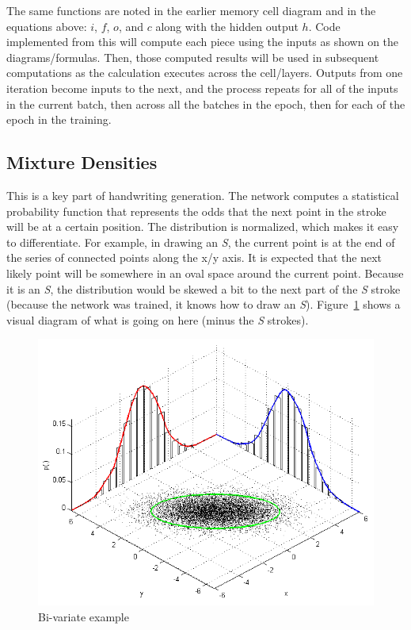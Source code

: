\documentclass{article}
\begin{document}
The same functions are noted in the earlier memory cell diagram and in the equations above: $i$, $f$, $o$, and $c$ along with the hidden output $h$. Code implemented from this will compute each piece using the inputs as shown on the diagrams/formulas. Then, those computed results will be used in subsequent computations as the calculation executes across the cell/layers. Outputs from one iteration become inputs to the next, and the process repeats for all of the inputs in the current batch, then across all the batches in the epoch, then for each of the epoch in the training.

\subsection{Mixture Densities}
This is a key part of handwriting generation. The network computes a statistical probability function that represents the odds that the next point in the stroke will be at a certain position. The distribution is normalized, which makes it easy to differentiate. For example, in drawing an \textit{S}, the current point is at the end of the series of connected points along the x/y axis. It is expected that the next likely point will be somewhere in an oval space around the current point. Because it is an \textit{S}, the distribution would be skewed a bit to the next part of the \textit{S} stroke (because the network was trained, it knows how to draw an \textit{S}). Figure~\ref{fig:bivariate} shows a visual diagram of what is going on here (minus the \textit{S} strokes).
    
    \begin{figure}[hbt!]
        \includegraphics[width=12cm]{graphics/Bivariate-example.png}
        \centering
        \caption{Bi-variate example \cite{monteiro}}
        \label{fig:bivariate}
    \end{figure}    
    
\end{document}
